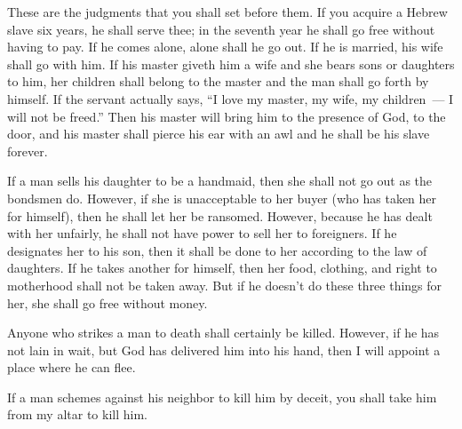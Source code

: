 
\begin{inparaenum}
   These are the judgments that you shall set before them.%
   If you acquire a Hebrew slave six years, he shall serve thee; in the seventh year he shall go free without having to pay.%
   If he comes alone, alone shall he go out. If he is married, his wife shall go with him.%
   If his master giveth him a wife and she bears sons or daughters to him, her children shall belong to the master and the man shall go forth by himself.%
   If the servant actually says, ``I love my master, my wife, my children~--- I will not be freed.''%
   Then his master will bring him to the presence of God, to the door, and his master shall pierce his ear with an awl and he shall be his slave forever.%
  
   If a man sells his daughter to be a handmaid, then she shall not go out as the bondsmen do.%
   However, if she is unacceptable to her buyer (who has taken her for himself), then he shall let her be ransomed. However, because he has dealt with her unfairly, he shall not have power to sell her to foreigners.%
   If he designates her to his son, then it shall be done to her according to the law of daughters.%
   If he takes another for himself, then her food, clothing, and right to motherhood shall not be taken away.%
   But if he doesn't do these three things for her, she shall go free without money.%
  
   Anyone who strikes a man to death shall certainly be killed.%
   However, if he has not lain in wait, but God has delivered him into his hand, then I will appoint a place where he can flee.%
  
   If a man schemes against his neighbor to kill him by deceit, you shall take him from my altar to kill him.%
  

\end{inparaenum}

